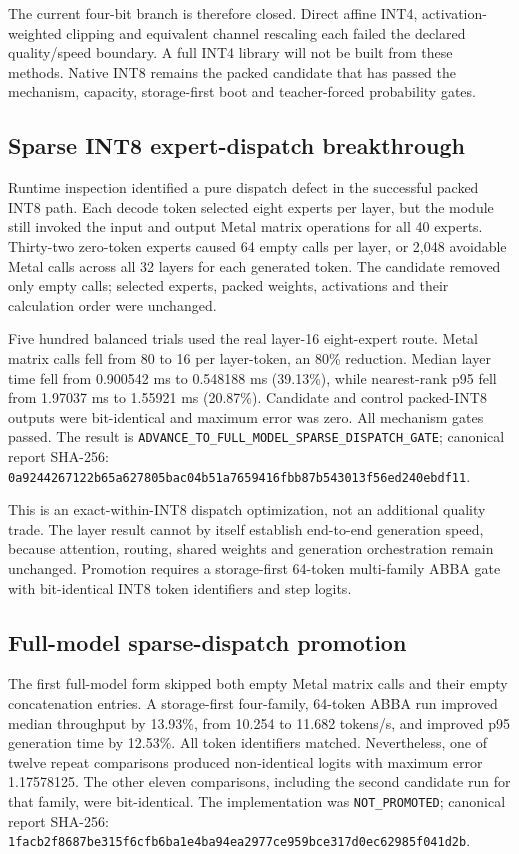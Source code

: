 The current four-bit branch is therefore closed. Direct affine INT4,
activation-weighted clipping and equivalent channel rescaling each failed the
declared quality/speed boundary. A full INT4 library will not be built from
these methods. Native INT8 remains the packed candidate that has passed the
mechanism, capacity, storage-first boot and teacher-forced probability gates.

\subsection{Sparse INT8 expert-dispatch breakthrough}

Runtime inspection identified a pure dispatch defect in the successful packed
INT8 path. Each decode token selected eight experts per layer, but the module
still invoked the input and output Metal matrix operations for all 40 experts.
Thirty-two zero-token experts caused 64 empty calls per layer, or 2,048
avoidable Metal calls across all 32 layers for each generated token. The
candidate removed only empty calls; selected experts, packed weights,
activations and their calculation order were unchanged.

Five hundred balanced trials used the real layer-16 eight-expert route. Metal
matrix calls fell from 80 to 16 per layer-token, an 80\% reduction. Median layer
time fell from 0.900542 ms to 0.548188 ms (39.13\%), while nearest-rank p95 fell
from 1.97037 ms to 1.55921 ms (20.87\%). Candidate and control packed-INT8
outputs were bit-identical and maximum error was zero. All mechanism gates
passed. The result is
\texttt{ADVANCE\_TO\_FULL\_MODEL\_SPARSE\_DISPATCH\_GATE}; canonical report
SHA-256:
\texttt{0a9244267122b65a627805bac04b51a7659416fbb87b543013f56ed240ebdf11}.

This is an exact-within-INT8 dispatch optimization, not an additional quality
trade. The layer result cannot by itself establish end-to-end generation speed,
because attention, routing, shared weights and generation orchestration remain
unchanged. Promotion requires a storage-first 64-token multi-family ABBA gate
with bit-identical INT8 token identifiers and step logits.

\subsection{Full-model sparse-dispatch promotion}

The first full-model form skipped both empty Metal matrix calls and their empty
concatenation entries. A storage-first four-family, 64-token ABBA run improved
median throughput by 13.93\%, from 10.254 to 11.682 tokens/s, and improved p95
generation time by 12.53\%. All token identifiers matched. Nevertheless, one of
twelve repeat comparisons produced non-identical logits with maximum error
1.17578125. The other eleven comparisons, including the second candidate run
for that family, were bit-identical. The implementation was
\texttt{NOT\_PROMOTED}; canonical report SHA-256:
\texttt{1facb2f8687be315f6cfb6ba1e4ba94ea2977ce959bce317d0ec62985f041d2b}.

